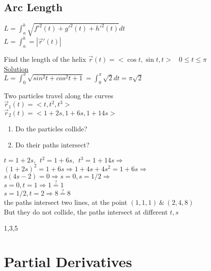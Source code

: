 \section{Arc Length}
$L=\int_{a}^{b}\sqrt{f'^2(t)+g'^2(t)+h'^2(t)}dt$\\
$L=\int_{a}^{b}=|\overrightarrow{r}'(t)|$\\
\noindent{\color{smalt(darkpowderblue)}\rule{\linewidth}{.2mm}}
\begin{example}
Find the length of the helix $\overrightarrow{r}(t)=<\cos{t},\sin{t},t>~~~~0\leq t\leq\pi$\\
\underline{\textbf{\large}\color{smalt(darkpowderblue)}Solution}\\
$L=\int_0^\pi \sqrt{sin^2t+cos^2t+1}=\int_0^\pi \sqrt{2}dt=\pi\sqrt{2}$
\end{example}
\noindent{\color{smalt(darkpowderblue)}\rule{\linewidth}{.2mm}}
\begin{example}
Two particles travel along the curves \\
$\overrightarrow{r}_1(t)=<t,t^2,t^3>$\\
$\overrightarrow{r}_2(t)=<1+2s,1+6s,1+14s>$
\begin{enumerate}
    \item Do the particles collide?
    \item Do their paths intersect?
\end{enumerate}
$t=1+2s,~~t^2=1+6s,~~t^3=1+14s\Rightarrow$\\
$(1+2s)^2=1+6s\Rightarrow1+4s+4s^2=1+6s\Rightarrow$\\
$s(4s-2)=0\Rightarrow s=0,s=1/2\Rightarrow$\\
$s=0,t=1\Rightarrow1\overset{?}{=}1$\\
$s=1/2,t=2\Rightarrow 8\overset{?}{=}8$\\
the paths intersect two lines, at the point $(1,1,1)~\&~(2,4,8)$\\
But they do not collide, the paths intersect at different $t,s$\\
\end{example}
\noindent{\color{smalt(darkpowderblue)}\rule{\linewidth}{.2mm}}
\begin{problem}
1,3,5
\end{problem}
\chapter{Partial Derivatives}
